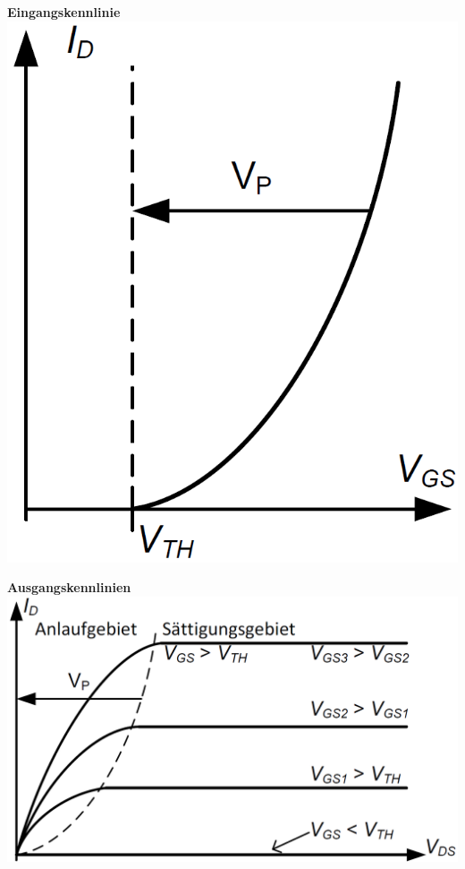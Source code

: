     \begin{minipage}[t]{0.3\columnwidth}
        \textbf{Eingangskennlinie} \\
        \includegraphics[align=c, width=\columnwidth]{images/mos_fet_eingangskennlinie.png}
    \end{minipage}
    \hfill
    \begin{minipage}[t]{0.6\columnwidth}
        \textbf{Ausgangskennlinien} \\
        \includegraphics[align=c, width=\columnwidth]{images/mos_fet_ausgangskennlinien.png}
    \end{minipage}


